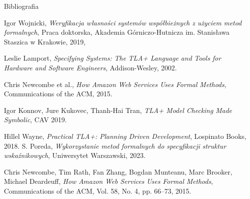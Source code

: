 \documentclass{purdue-poster}
\begin{document}
\begin{frame}{}
\begin{columns}[c]
\begin{column}{.48\linewidth}
\begin{block}{\large Bibliografia}
{\begin{thebibliography}{00}
            Igor Wojnicki,
            \textit{Weryfikacja własności systemów współbieżnych z użyciem metod formalnych},
            Praca doktorska, Akademia Górniczo-Hutnicza im. Stanisława Staszica w Krakowie, 2019,

            Leslie Lamport, \emph{Specifying Systems: The TLA+ Language and Tools for Hardware and Software Engineers}, Addison-Wesley, 2002.
        
            Chris Newcombe et al., \emph{How Amazon Web Services Uses Formal Methods}, Communications of the ACM, 2015.
        
            Igor Konnov, Jure Kukovec, Thanh-Hai Tran, \emph{TLA+ Model Checking Made Symbolic}, CAV 2019.
        
            Hillel Wayne, \emph{Practical TLA+: Planning Driven Development}, Lospinato Books, 2018.
            S. Poreda,
            \textit{Wykorzystanie metod formalnych do specyfikacji struktur wskaźnikowych},
            Uniwersytet Warszawski, 2023.

            Chris Newcombe, Tim Rath, Fan Zhang, Bogdan Munteanu, Marc Brooker, Michael Deardeuff, \emph{How Amazon Web Services Uses Formal Methods}, Communications of the ACM, Vol. 58, No. 4, pp. 66--73, 2015.
        \end{thebibliography}
        }
    \end{block}
    \end{column}
    \end{columns}
    \vfill
\end{frame}
\end{document}
